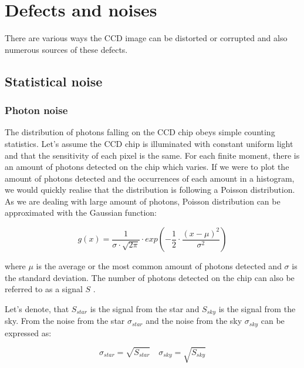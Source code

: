 \section{Defects and noises} \label{sec:defects}

There are various ways the CCD image can be distorted or corrupted and also numerous sources of these defects. 


\subsection{Statistical noise}

    \subsubsection{Photon noise}
    
    The distribution of photons falling on the CCD chip obeys simple counting statistics. 
    Let's assume the CCD chip is illuminated with constant uniform light and that the sensitivity of each pixel is the same. 
    For each finite moment, there is an amount of photons detected on the chip which varies.
    If we were to plot the amount of photons detected and the occurrences of each amount in a histogram, we would quickly realise that the distribution is following a Poisson distribution. As we are dealing with large amount of photons, Poisson distribution can be approximated with the Gaussian function: 
    
    \begin{equation}
     \label{eqn:gaussian}
        g(x) = \frac{1}{\sigma \cdot \sqrt{2 \pi}} \cdot exp \left(  - \frac{1}{2} \cdot \frac{(x - \mu)^2}{\sigma^2} \right)   
    \end{equation}
    
    where $\mu$ is the average or the most common amount of photons detected and $\sigma$ is the standard deviation. 
    The number of photons detected on the chip can also be referred to as a signal $S$ \cite{romanishin2006introduction}.
    
    Let's denote, that $S_{star}$ is the signal from the star and $S_{sky}$ is the signal from the sky. From \cite{romanishin2006introduction} the noise from the star $\sigma_{star}$ and the noise from the sky $\sigma_{sky}$ can be expressed as:
    
    \begin{equation}
    \label{eqn:starskynoise}
        \sigma_{star} = \sqrt{S_{star}} \quad \sigma_{sky} = \sqrt{S_{sky}}
    \end{equation} 

